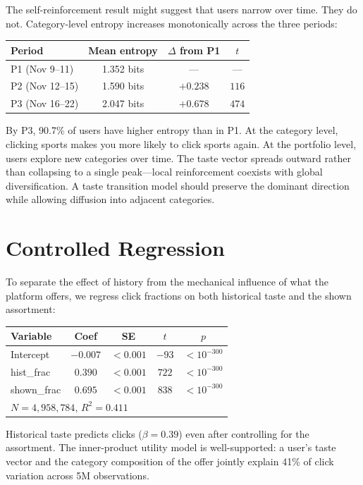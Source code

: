 \documentclass[11pt]{article}
\begin{document}
The self-reinforcement result might suggest that users narrow over time. They do not. Category-level entropy increases monotonically across the three periods:

\begin{center}
\begin{tabular}{lccc}
\toprule
Period & Mean entropy & $\Delta$ from P1 & $t$ \\
\midrule
P1 (Nov 9--11) & 1.352 bits & --- & --- \\
P2 (Nov 12--15) & 1.590 bits & $+0.238$ & $116$ \\
P3 (Nov 16--22) & 2.047 bits & $+0.678$ & $474$ \\
\bottomrule
\end{tabular}
\end{center}

By P3, 90.7\% of users have higher entropy than in P1. At the category level, clicking sports makes you more likely to click sports again. At the portfolio level, users explore new categories over time. The taste vector spreads outward rather than collapsing to a single peak---local reinforcement coexists with global diversification. A taste transition model should preserve the dominant direction while allowing diffusion into adjacent categories.

\section{Controlled Regression}

To separate the effect of history from the mechanical influence of what the platform offers, we regress click fractions on both historical taste and the shown assortment:

\begin{center}
\begin{tabular}{lcccc}
\toprule
Variable & Coef & SE & $t$ & $p$ \\
\midrule
Intercept & $-0.007$ & $<0.001$ & $-93$ & $< 10^{-300}$ \\
hist\_frac & $0.390$ & $<0.001$ & $722$ & $< 10^{-300}$ \\
shown\_frac & $0.695$ & $<0.001$ & $838$ & $< 10^{-300}$ \\
\midrule
\multicolumn{5}{l}{$N = 4{,}958{,}784$, \quad $R^2 = 0.411$} \\
\bottomrule
\end{tabular}
\end{center}

Historical taste predicts clicks ($\beta = 0.39$) even after controlling for the assortment. The inner-product utility model is well-supported: a user's taste vector and the category composition of the offer jointly explain 41\% of click variation across 5M observations.
\end{document}
